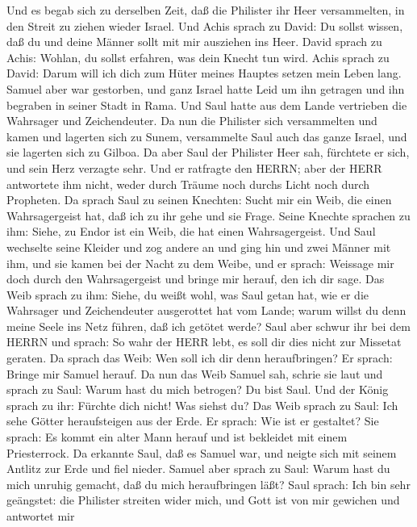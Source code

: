  Und es begab sich zu derselben Zeit, daß die Philister ihr
Heer versammelten, in den Streit zu ziehen wieder Israel. Und Achis
sprach zu David: Du sollst wissen, daß du und deine Männer sollt mit mir
ausziehen ins Heer.  David sprach zu Achis: Wohlan, du
sollst erfahren, was dein Knecht tun wird. Achis sprach zu David: Darum
will ich dich zum Hüter meines Hauptes setzen mein Leben lang.
 Samuel aber war gestorben, und ganz Israel hatte Leid um
ihn getragen und ihn begraben in seiner Stadt in Rama. Und Saul hatte
aus dem Lande vertrieben die Wahrsager und Zeichendeuter. 
Da nun die Philister sich versammelten und kamen und lagerten sich zu
Sunem, versammelte Saul auch das ganze Israel, und sie lagerten sich zu
Gilboa.  Da aber Saul der Philister Heer sah, fürchtete er
sich, und sein Herz verzagte sehr.  Und er ratfragte den
HERRN; aber der HERR antwortete ihm nicht, weder durch Träume noch
durchs Licht noch durch Propheten.  Da sprach Saul zu seinen
Knechten: Sucht mir ein Weib, die einen Wahrsagergeist hat, daß ich zu
ihr gehe und sie Frage. Seine Knechte sprachen zu ihm: Siehe, zu Endor
ist ein Weib, die hat einen Wahrsagergeist.  Und Saul
wechselte seine Kleider und zog andere an und ging hin und zwei Männer
mit ihm, und sie kamen bei der Nacht zu dem Weibe, und er sprach:
Weissage mir doch durch den Wahrsagergeist und bringe mir herauf, den
ich dir sage.  Das Weib sprach zu ihm: Siehe, du weißt wohl,
was Saul getan hat, wie er die Wahrsager und Zeichendeuter ausgerottet
hat vom Lande; warum willst du denn meine Seele ins Netz führen, daß ich
getötet werde?  Saul aber schwur ihr bei dem HERRN und
sprach: So wahr der HERR lebt, es soll dir dies nicht zur Missetat
geraten.  Da sprach das Weib: Wen soll ich dir denn
heraufbringen? Er sprach: Bringe mir Samuel herauf.  Da nun
das Weib Samuel sah, schrie sie laut und sprach zu Saul: Warum hast du
mich betrogen? Du bist Saul.  Und der König sprach zu ihr:
Fürchte dich nicht! Was siehst du? Das Weib sprach zu Saul: Ich sehe
Götter heraufsteigen aus der Erde.  Er sprach: Wie ist er
gestaltet? Sie sprach: Es kommt ein alter Mann herauf und ist bekleidet
mit einem Priesterrock. Da erkannte Saul, daß es Samuel war, und neigte
sich mit seinem Antlitz zur Erde und fiel nieder.  Samuel
aber sprach zu Saul: Warum hast du mich unruhig gemacht, daß du mich
heraufbringen läßt? Saul sprach: Ich bin sehr geängstet: die Philister
streiten wider mich, und Gott ist von mir gewichen und antwortet mir
